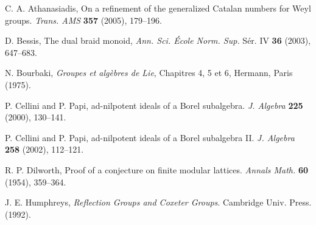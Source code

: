 \documentclass[amsa]{ipart}
\begin{document}
\begin{thebibliography}{9}

 C. A. Athanasiadis, On a refinement of the generalized
Catalan numbers for Weyl groups. \textit{Trans. AMS} \textbf{357} (2005), 179--196.

 D. Bessis, The dual braid monoid,
\textit{Ann. Sci. \'Ecole Norm. Sup.} S\'er. IV \textbf{36} (2003), 647--683.

 N. Bourbaki,
\textit{Groupes et alg\`ebres de Lie}, Chapitres 4, 5 et 6, Hermann,
Paris (1975).

 P. Cellini and P. Papi,
ad-nilpotent ideals of a Borel subalgebra. \textit{J. Algebra} \textbf{225} (2000), 130--141.

 P. Cellini and P. Papi,
ad-nilpotent ideals of a Borel subalgebra II. \textit{J. Algebra} \textbf{258} (2002), 112--121.

R. P. Dilworth,  Proof of a conjecture on finite modular
lattices.
\textit{Annals Math.} \textbf{60} (1954), 359--364.

J. E. Humphreys,  \textit{Reflection Groups and Coxeter Groups}.
Cambridge Univ. Press. (1992).

\end{thebibliography}
\end{document}
